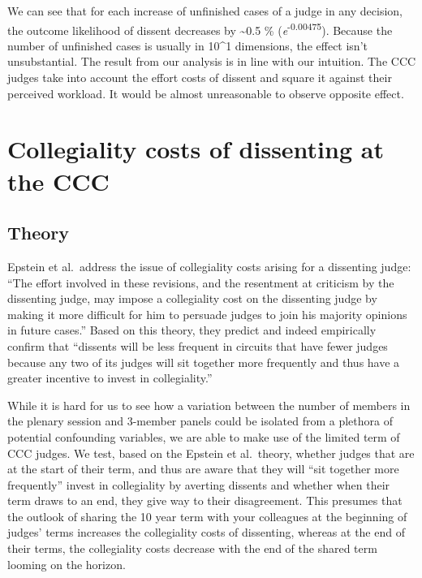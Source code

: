 \documentclass[
  11pt,
]{article}
\begin{document}
We can see that for each increase of unfinished cases of a judge in any
decision, the outcome likelihood of dissent decreases by
\textasciitilde0.5 \% (\emph{e}\textsuperscript{-0.00475}). Because the
number of unfinished cases is usually in 10\^{}1 dimensions, the effect
isn't unsubstantial. The result from our analysis is in line with our
intuition. The CCC judges take into account the effort costs of dissent
and square it against their perceived workload. It would be almost
unreasonable to observe opposite effect.

\hypertarget{collegiality-costs-of-dissenting-at-the-ccc}{%
\section{Collegiality costs of dissenting at the
CCC}\label{collegiality-costs-of-dissenting-at-the-ccc}}

\hypertarget{theory-1}{%
\subsection{Theory}\label{theory-1}}

Epstein et al.~address the issue of collegiality costs arising for a
dissenting judge: ``The effort involved in these revisions, and the
resentment at criticism by the dissenting judge, may impose a
collegiality cost on the dissenting judge by making it more difficult
for him to persuade judges to join his majority opinions in future
cases.'' Based on this theory, they predict and indeed empirically
confirm that ``dissents will be less frequent in circuits that have
fewer judges because any two of its judges will sit together more
frequently and thus have a greater incentive to invest in
collegiality.''

While it is hard for us to see how a variation between the number of
members in the plenary session and 3-member panels could be isolated
from a plethora of potential confounding variables, we are able to make
use of the limited term of CCC judges. We test, based on the Epstein et
al.~theory, whether judges that are at the start of their term, and thus
are aware that they will ``sit together more frequently'' invest in
collegiality by averting dissents and whether when their term draws to
an end, they give way to their disagreement. This presumes that the
outlook of sharing the 10 year term with your colleagues at the
beginning of judges' terms increases the collegiality costs of
dissenting, whereas at the end of their terms, the collegiality costs
decrease with the end of the shared term looming on the horizon.
\end{document}
